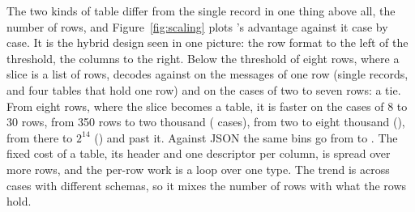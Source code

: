 The two kinds of table differ from the single record in one thing above all,
the number of rows, and Figure~\ref{fig:scaling} plots \colbin{}'s advantage
against it case by case. It is the hybrid design seen in one picture: the
row format to the left of the threshold, the columns to the right. Below the threshold of eight rows, where a slice is
a list of rows, \colbin{} decodes
 against 
on the  messages of one row (single records, and four
tables that hold one row) and
 on the
 cases of two to seven rows: a tie. From eight rows,
where the slice becomes a table, it is
 faster on the
 cases of 8 to 30 rows,
 from 350 rows to
two thousand ( cases),
 from two to eight
thousand (),
 from there to
$2^{14}$ () and
 past it. Against JSON
the same bins go from  to
. The fixed cost of a
table, its header and one descriptor per column, is spread over more rows,
and the per-row work is a loop over one type. The trend is across cases with
different schemas, so it mixes the number of rows with what the rows hold.

